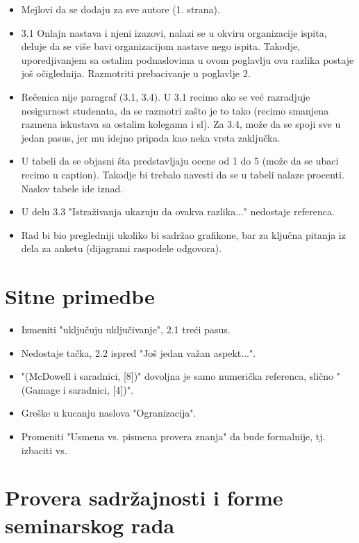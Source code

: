 \documentclass[a4paper]{report}
\begin{document}
\begin{itemize}
    \item Mejlovi da se dodaju za sve autore (1. strana).
    \item 3.1 Onlajn nastava i njeni izazovi, nalazi se u okviru organizacije ispita, deluje da se više bavi organizacijom nastave nego ispita. Takodje, uporedjivanjem sa ostalim podnaslovima u ovom poglavlju ova razlika postaje još očiglednija. Razmotriti prebacivanje u poglavlje 2.
    \item Rečenica nije paragraf (3.1, 3.4). U 3.1 recimo ako se već razradjuje nesigurnost studenata, da se razmotri zašto je to tako (recimo smanjena razmena iskustava sa ostalim kolegama i sl). Za 3.4, može da se spoji sve u jedan pasus, jer mu idejno pripada kao neka vrsta zaključka.
    \item U tabeli da se objasni šta predstavljaju ocene od 1 do 5 (može da se ubaci recimo u caption). Takodje bi trebalo navesti da se u tabeli nalaze procenti. Naslov tabele ide iznad.
    \item U delu 3.3 "Istraživanja ukazuju da ovakva razlika..."\hspace{0.1cm} nedostaje referenca.
    \item Rad bi bio pregledniji ukoliko bi sadržao grafikone, bar za ključna pitanja iz dela za anketu (dijagrami raspodele odgovora).
\end{itemize}

\section{Sitne primedbe}


\begin{itemize}
    \item Izmeniti "uključuju uključivanje", 2.1 treći pasus.
    \item Nedostaje tačka, 2.2 ispred "Još
    jedan važan aspekt...".
    \item "(McDowell i saradnici, [8])"\hspace{0.1cm} dovoljna je samo numerička referenca, slično  "(Gamage i saradnici, [4])".
    \item Greške u kucanju naslova "Ogranizacija".
    \item Promeniti "Usmena vs. pismena provera znanja"\hspace{0.1cm} da bude formalnije, tj. izbaciti vs.
\end{itemize}


\section{Provera sadržajnosti i forme seminarskog rada}
\end{document}
